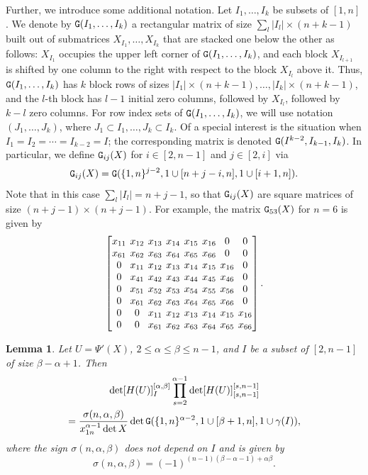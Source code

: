 \documentclass{amsart}
\newtheorem{lemma}[theorem]{Lemma}
\theoremstyle{definition}
\theoremstyle{remark}
\numberwithin{equation}{section}
\numberwithin{theorem}{section}
\def\NG{{\tt G}}
\def\nar{\setlength\arraycolsep{2pt}}
\begin{document}
Further, we introduce some additional notation. Let $I_1,\ldots, I_k$ be subsets of $[1,n]$. We denote by $\NG(I_1,\ldots, I_k)$ a rectangular matrix of size $\sum_l|I_l|\times(n+k-1)$ built out of submatrices 
$X_{I_1},\ldots, X_{I_k}$ that are stacked one below the other as follows: $X_{I_1}$ occupies the upper left corner of $\NG(I_1,\ldots, I_k)$, and each block $X_{I_{l+1}}$ is shifted by one column to the right with respect to the block 
$X_{I_{l}}$ above it. Thus, 
$\NG(I_1,\ldots, I_k)$ has $k$ block rows of sizes $|I_1|\times (n+k-1), \ldots, |I_k|\times (n+k-1)$, and the $l$-th block has  $l-1$ initial zero columns, followed by $X_{I_{l}}$, followed by $k-l$ zero columns. 
For row index sets of $\NG(I_1,\ldots, I_k)$, we will use notation $(J_1,\ldots , J_k)$, where $J_1 \subset I_1, \ldots, J_k \subset I_k$.
Of a special interest is the situation when $I_1=I_2={\cdots}=I_{k-2}=I$; the corresponding matrix is denoted $\NG(I^{k-2},I_{k-1},I_k)$. In 
particular, we define 
$\NG_{ij}(X)$ for $i\in[2,n-1]$ and $j\in [2,i]$ via 
\[
\NG_{ij}(X)=\NG(\{1,n\}^{j-2},1\cup[n+j-i,n],1\cup[i+1,n]).
\] 
Note that in this case $\sum_l|I_l|=n+j-1$, so that $\NG_{ij}(X)$ are
square matrices of size $(n+j-1)\times(n+j-1)$. For example, the matrix $\NG_{53}(X)$ for 
$n=6$ is given by
\[
\nar\begin{bmatrix}
x_{11} & x_{12} & x_{13} & x_{14} & x_{15} & x_{16} & 0 & 0\\
x_{61} & x_{62} & x_{63} & x_{64} & x_{65} & x_{66} & 0 & 0\\
0 & x_{11} & x_{12} & x_{13} & x_{14} & x_{15} & x_{16} & 0 \\
0 & x_{41} & x_{42} & x_{43} & x_{44} & x_{45} & x_{46} & 0 \\
0 & x_{51} & x_{52} & x_{53} & x_{54} & x_{55} & x_{56} & 0 \\
0 & x_{61} & x_{62} & x_{63} & x_{64} & x_{65} & x_{66} & 0 \\
0 & 0 & x_{11} & x_{12} & x_{13} & x_{14} & x_{15} & x_{16}  \\
0 & 0 & x_{61} & x_{62} & x_{63} & x_{64} & x_{65} & x_{66} \\
\end{bmatrix}.
\]

\begin{lemma}\label{lem:gfunXgen}
Let $U=\Psi'(X)$, $2\leq \alpha \leq \beta \leq n-1$, and $I$ be a subset of $[2,n-1]$ of size $\beta -\alpha +1$. Then
\begin{multline}
\label{eq:gfunXgen}
\det [H(U)]_{I}^{[\alpha,\beta]}\prod_{s=2}^{\alpha-1}\det [H(U)]_{[s,n-1]}^{[s,n-1]} \\= 
\frac{\sigma(n,\alpha,\beta)}{x_{1n}^{\alpha-1}\det X}\det\NG(\{1,n\}^{\alpha-2},1\cup[\beta +1, n],1\cup\gamma(I)), 
\end{multline}
where the sign $\sigma(n,\alpha,\beta)$ does not depend on $I$ and is given by
\begin{equation}\label{gsigngen}
\sigma(n,\alpha,\beta)=(-1)^{(n-1)(\beta-\alpha-1)+\alpha\beta}.
\end{equation}
\end{lemma}
\end{document}
